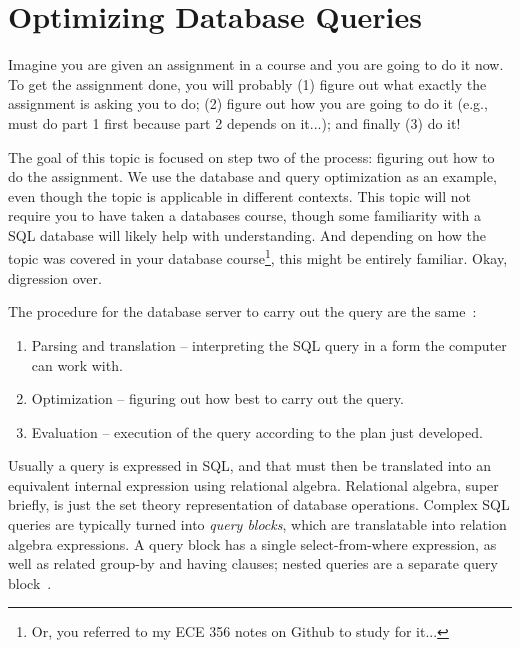 




\section*{Optimizing Database Queries}

Imagine you are given an assignment in a course and you are going to do it now. To get the assignment done, you will probably (1) figure out what exactly the assignment is asking you to do; (2) figure out how you are going to do it (e.g., must do part 1 first because part 2 depends on it...); and finally (3) do it! 

The goal of this topic is focused on step two of the process: figuring out how to do the assignment. We use the database and query optimization as an example, even though the topic is applicable in different contexts. This topic will not require you to have taken a databases course, though some familiarity with a SQL database will likely help with understanding. And depending on how the topic was covered in your database course\footnote{Or, you referred to my ECE 356 notes on Github to study for it...}, this might be entirely familiar. Okay, digression over. 

The procedure for the database server to carry out the query are the same~\cite{dsc}:

\begin{enumerate}
	\item Parsing and translation -- interpreting the SQL query in a form the computer can work with.
	\item Optimization -- figuring out how best to carry out the query.
	\item Evaluation -- execution of the query according to the plan just developed.
\end{enumerate}

Usually a query is expressed in SQL, and that must then be translated into an equivalent internal expression using relational algebra. Relational algebra, super briefly, is just the set theory representation of database operations. Complex SQL queries are typically turned into \textit{query blocks}, which are translatable into relation algebra expressions. A query block has a single select-from-where expression, as well as related group-by and having clauses; nested queries are a separate query block~\cite{fds}.

